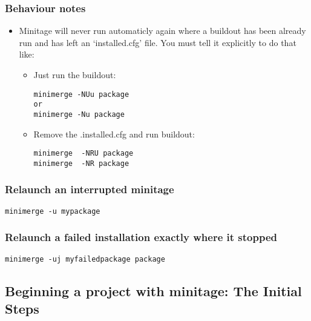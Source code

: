 \documentclass[letterpaper,10pt,english]{sphinxmanual}
\begin{document}
\subsubsection{Behaviour notes}
\label{usecases/using_minimerge:behaviour-notes}\begin{itemize}
\item {} 
Minitage will never run automaticly again where a buildout has been
already run and has left an `installed.cfg' file. You must tell it
explicitly to do that like:
\begin{itemize}
\item {} 
Just run the buildout:

\begin{Verbatim}[commandchars=@\[\]]
minimerge -NUu package
or
minimerge -Nu package
\end{Verbatim}

\item {} 
Remove the .installed.cfg and run buildout:

\begin{Verbatim}[commandchars=@\[\]]
minimerge  -NRU package
minimerge  -NR package
\end{Verbatim}

\end{itemize}

\end{itemize}


\subsubsection{Relaunch an interrupted minitage}
\label{usecases/using_minimerge:relaunch-an-interrupted-minitage}
\begin{Verbatim}[commandchars=@\[\]]
minimerge -u mypackage
\end{Verbatim}


\subsubsection{Relaunch a failed installation exactly where it stopped}
\label{usecases/using_minimerge:relaunch-a-failed-installation-exactly-where-it-stopped}
\begin{Verbatim}[commandchars=@\[\]]
minimerge -uj myfailedpackage package
\end{Verbatim}


\subsection{Beginning a project with minitage: The Initial Steps}
\label{usecases/begin_project:beginning-a-project-with-minitage-the-initial-steps}\label{usecases/begin_project::doc}
\end{document}
